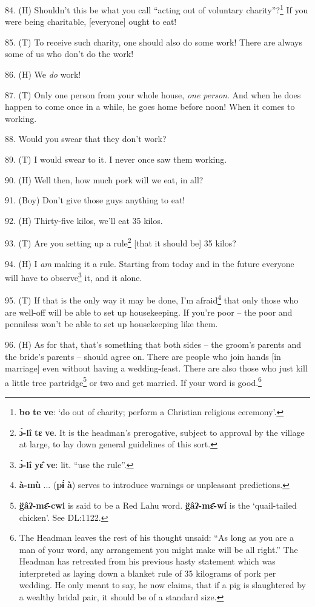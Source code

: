 84. (H) Shouldn't this be what you call ``acting out of voluntary charity''?\footnote{\textbf{bo} \textbf{te} \textbf{ve}: `do out of charity; perform a Christian religious ceremony'.}
If you were being charitable, [everyone] ought to eat!

85. (T) To receive such charity, one should also do some work! There are always
some of us who don't do the work!

86. (H) We \textit{do} work!

87. (T) Only one person from your whole house, \textit{one person}. And when he
does happen to come once in a while, he goes home before noon! When it comes to
working.

88. Would you swear that they don't work?

89. (T) I would swear to it. I never once saw them working.

90. (H) Well then, how much pork will we eat, in all?

91. (Boy) Don't give those guys anything to eat!

92. (H) Thirty-five kilos, we'll eat 35 kilos.

93. (T) Are you setting up a rule\footnote{\textbf{ɔ̀-lî} \textbf{tɛ} \textbf{ve}. It is the headman's prerogative, subject to approval by the village at large, to lay down general guidelines of this sort.} [that it should be] 35 kilos?

94. (H) I \textit{am} making it a rule. Starting from today and in the future everyone
will have to observe\footnote{\textbf{ɔ̀-lî} \textbf{yɛ̂} \textbf{ve}: lit. ``use the rule''.} it, and it alone.

95. (T) If that is the only way it may be done, I'm afraid\footnote{\textbf{à-mù} ... (\textbf{pɨ́} \textbf{à}) serves to introduce warnings or unpleasant predictions.} that only those
who are well-off will be able to set up housekeeping. If you're poor -- the poor
and penniless won't be able to set up housekeeping like them.

96. (H) As for that, that's something that both sides -- the groom's parents and
the bride's parents -- should agree on. There are people who join hands [in marriage]
even without having a wedding-feast. There are also those who just kill a little
tree partridge\footnote{\textbf{g̈âʔ-mɛ̄-cwi} is said to be a Red Lahu word. \textbf{g̈âʔ-mɛ̄-wí} is the `quail-tailed chicken'. See DL:1122.} or two and get married. If your word is good.\footnote{The Headman leaves the rest of his thought unsaid: ``As long as you are a man of your word, any arrangement you might make will be all right.'' The Headman has retreated from his previous hasty statement which was interpreted as laying down a blanket rule of 35 kilograms of pork per wedding. He only meant to say, he now claims, that if a pig is slaughtered by a wealthy bridal pair, it should be of a standard size.}

